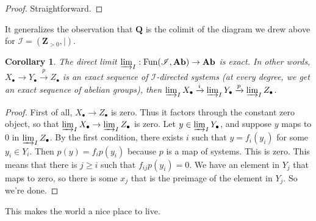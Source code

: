 \documentclass{amsart}
\theoremstyle{theorem}
\newtheorem{corollary}[theorem]{Corollary}
\theoremstyle{definition}
\DeclareMathOperator{\Fun}{Fun}
\def\cI{\mathscr I}\def\cJ{\mathscr J}\def\cK{\mathscr K}\def\cL{\mathscr L}
\def\QQ{\mathbf Q}\def\RR{\mathbf R}\def\SS{\mathbb S}\def\TT{\mathbb T}
\newcommand{\Z}{\mathbf Z}
\begin{document}
\begin{proof}
Straightforward.
\end{proof}
It generalizes the observation that $\QQ$ is the colimit of the diagram we drew above for $\cI=(\Z_{>0},|)$.
\begin{corollary}
The direct limit $\varinjlim_I:\Fun(\cI,\mathbf{Ab})\to\mathbf{Ab}$ is exact. In other words, $X_\bullet\to Y_\bullet\xrightarrow{p} Z_\bullet$ is an exact sequence of $\cI$-directed systems (at every degree, we get an exact sequence of abelian groups), then $\varinjlim_IX_\bullet\xrightarrow{i} \varinjlim_IY_\bullet\xrightarrow{p} \varinjlim_IZ_\bullet$.
\end{corollary}
\begin{proof}
First of all, $X_\bullet\to Z_\bullet$ is zero. Thus it factors through the constant zero object, so that $\varinjlim_IX_\bullet\to \varinjlim_I Z_\bullet$ is zero. Let $y\in \varinjlim_IY_\bullet$, and suppose $y$ maps to $0$ in $\varinjlim_IZ_\bullet$. By the first condition, there exists $i$ such that $y=f_i(y_i)$ for some $y_i\in Y_i$. Then $p(y)=f_ip(y_i)$ because $p$ is a map of systems. This is zero. This means that there is $j\geq i$ such that $f_{ij}p(y_i)=0$. We have an element in $Y_j$ that maps to zero, so there is some $x_j$ that is the preimage of the element in $Y_j$. So we're done.
\end{proof}
This makes the world a nice place to live.
\end{document}
